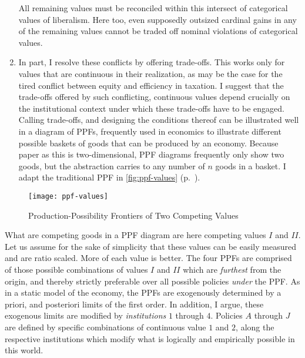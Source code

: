 \begin{enumerate}
		All remaining values must be reconciled within this intersect of categorical values of liberalism.
		Here too, even supposedly outsized cardinal gains in any of the remaining values cannot be traded off nominal violations of categorical values.
	\item
		In part, I resolve these conflicts by offering trade-offs.
		This works only for values that are continuous in their realization, as may be the case for the tired conflict between equity and efficiency in taxation. %
		I suggest that the trade-offs offered by such conflicting, continuous values depend crucially on the institutional context under which these trade-offs have to be engaged.
		Calling trade-offs, and designing the conditions thereof can be illustrated well in a diagram of \glspl{PPF}, frequently used in economics to illustrate different possible baskets of goods that can be produced by an economy. 
		Because paper as this is two-dimensional, \gls{PPF} diagrams frequently only show two goods, but the abstraction carries to any number of $n$ goods in a basket.
		I adapt the traditional \gls{PPF} in \autoref{fig:ppf-values} (p.~\pageref{fig:ppf-values}). 
\end{enumerate}

\begin{figure}[htbp]
	\centering
	\texttt{[image: ppf-values]}  
	\caption{Production-Possibility Frontiers of Two Competing Values}
	\label{fig:ppf-values}
\end{figure}%

	What are competing goods in a \gls{PPF} diagram are here competing values $I$ and $II$. 
	Let us assume for the sake of simplicity that these values can be easily measured and are ratio scaled.
	More of each value is better.
	The four \glspl{PPF} are comprised of those possible combinations of values $I$ and $II$ which are \emph{furthest} from the origin, and thereby strictly preferable over all possible policies \emph{under} the \gls{PPF}.
	As in a static model of the economy, the \glspl{PPF} are exogenously determined by a priori, and posteriori limits of the first order.
	In addition, I argue, these exogenous limits are modified by \emph{institutions} $1$ through $4$.
	 Policies $A$ through $J$ are defined by specific combinations of continuous value $1$ and $2$, along the respective institutions which modify what is logically and empirically possible in this world.
	
